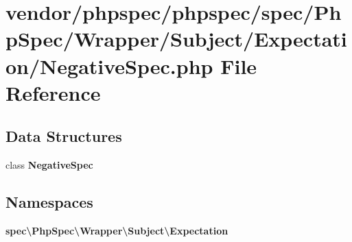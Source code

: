\section{vendor/phpspec/phpspec/spec/\+Php\+Spec/\+Wrapper/\+Subject/\+Expectation/\+Negative\+Spec.php File Reference}
\label{_negative_spec_8php}
\subsection*{Data Structures}
\begin{DoxyCompactItemize}
\item 
class {\bf Negative\+Spec}
\end{DoxyCompactItemize}
\subsection*{Namespaces}
\begin{DoxyCompactItemize}
\item 
 {\bf spec\textbackslash{}\+Php\+Spec\textbackslash{}\+Wrapper\textbackslash{}\+Subject\textbackslash{}\+Expectation}
\end{DoxyCompactItemize}
